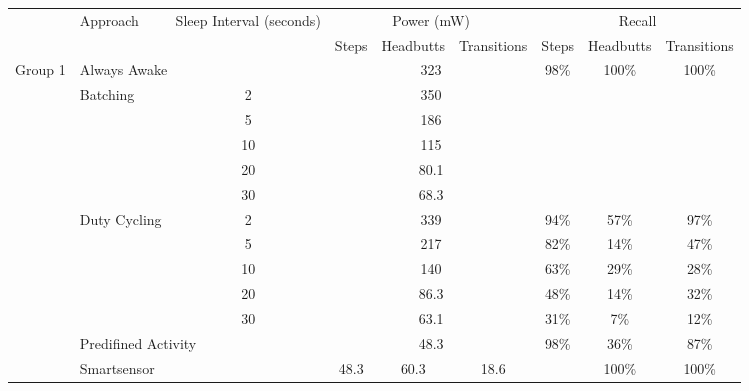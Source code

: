 
\begin{table*}[t]
{\small
    \begin{tabular}{|l|l|c|c|c|c|c|c|c|}
    \hline
	\multirow{2}{*}{~}			& \multirow{2}{*}{Approach}		& \multirow{2}{*}{\parbox{2.2cm}{Sleep Interval (seconds)}}	
																						& \multicolumn{3}{c|}{Power (mW)}		& \multicolumn{3}{c|}{Recall} 													\\ \cline{4-9}
								&								&						& Steps	& Headbutts	& Transitions	& Steps				& Headbutts					& Transitions 				\\ \hline
	\multirow{14}{*}{Group 1}	& \multicolumn{2}{l|}{Always Awake}						& \multicolumn{3}{c|}{323}				& \multirow{6}{*}{98\%}	& \multirow{6}{*}{100\%}	& \multirow{6}{*}{100\%}	\\ \cline{2-6}
								& \multirow{5}{*}{Batching}		& 2						& \multicolumn{3}{c|}{350}				&						&							&							\\ \cline{3-6}
								& 								& 5						& \multicolumn{3}{c|}{186}				&						&							&							\\ \cline{3-6}
								& 								& 10					& \multicolumn{3}{c|}{115}				&						&							&							\\ \cline{3-6}
								& 								& 20					& \multicolumn{3}{c|}{80.1}				&						&							&							\\ \cline{3-6}
								& 								& 30					& \multicolumn{3}{c|}{68.3}				&						&							&							\\ \cline{2-9}
								& \multirow{5}{*}{Duty Cycling}	& 2						& \multicolumn{3}{c|}{339}				& 94\%					& 57\%						& 97\%						\\ \cline{3-9}
								& 								& 5						& \multicolumn{3}{c|}{217}				& 82\%					& 14\%						& 47\%						\\ \cline{3-9}
								& 								& 10					& \multicolumn{3}{c|}{140}				& 63\%					& 29\%						& 28\%						\\ \cline{3-9}
								& 								& 20					& \multicolumn{3}{c|}{86.3}				& 48\%					& 14\%						& 32\%						\\ \cline{3-9}
								& 								& 30					& \multicolumn{3}{c|}{63.1}				& 31\%					& 7\%						& 12\%						\\ \cline{2-9}
								& \multicolumn{2}{l|}{Predifined Activity}	& \multicolumn{3}{c|}{48.3}				& \multirow{3}{*}{98\%}	& 36\%						& 87\%						\\ \cline{2-6}\cline{8-9}
								& \multicolumn{2}{l|}{Smartsensor}	& 48.3		& 60.3		& 18.6			& 						& \multirow{2}{*}{100\%}	& \multirow{2}{*}{100\%}	\\ \cline{2-6}

\end{tabular}}
\end{table*}
